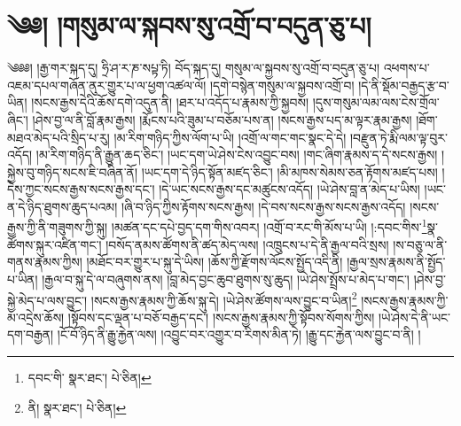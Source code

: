 \setcounter{footnote}{0} 
\chapter{༄༅། །གསུམ་ལ་སྐབས་སུ་འགྲོ་བ་བདུན་ཅུ་པ།}༄༅༅། །རྒྱ་གར་སྐད་དུ། ཧྲི་ཤ་ར་ཎ་སཔྟ་ཏི། བོད་སྐད་དུ། གསུམ་ལ་སྐྱབས་སུ་འགྲོ་བ་བདུན་ཅུ་པ། འཕགས་པ་འཇམ་དཔལ་གཞོན་ནུར་གྱུར་པ་ལ་ཕྱག་འཚལ་ལོ། །དགེ་བསྙེན་གསུམ་ལ་སྐྱབས་འགྲོ་བ། །དེ་ནི་སྡོམ་བརྒྱད་རྩ་བ་ཡིན། །སངས་རྒྱས་དེའི་ཆོས་དགེ་འདུན་ནི། །ཐར་པ་འདོད་པ་རྣམས་ཀྱི་སྐྱབས། །དུས་གསུམ་ལམ་ལས་ངེས་གྲོལ་ཞིང་། །ཤེས་བྱ་ལ་ནི་བློ་རྣམ་རྒྱས། །རྨོངས་པའི་ཟུམ་པ་བཅོམ་པས་ན། །སངས་རྒྱས་པད་མ་ལྟར་རྣམ་རྒྱས། །ཐོག་མཐའ་མེད་པའི་སྲིད་པ་རུ། །མ་རིག་གཉིད་ཀྱིས་ལོག་པ་ཡི། །འགྲོ་ལ་གང་གང་སྣང་དེ་དེ། །བརྫུན་ཏེ་རྨི་ལམ་ལྟ་བུར་འདོད། །མ་རིག་གཉིད་ནི་རྒྱུན་ཆད་ཅིང་། །ཡང་དག་ཡེ་ཤེས་ངེས་འབྱུང་བས། །གང་ཞིག་རྣམས་ད་དེ་སངས་རྒྱས། །སྐྱེས་བུ་གཉིད་སངས་ཇི་བཞིན་ནོ། །ཡང་དག་དེ་ཉིད་སྟོན་མཛད་ཅིང་། །མི་མཁས་སེམས་ཅན་རྟོགས་མཛད་པས། །དེས་ཀྱང་སངས་རྒྱས་སངས་རྒྱས་དང་། །དེ་ཡང་སངས་རྒྱས་དང་མཚུངས་འདོད། །ཡེ་ཤེས་བླ་ན་མེད་པ་ཡིས། །ཡང་ན་དེ་ཉིད་ཐུགས་ཆུད་པའམ། །ཞི་བ་ཉིད་ཀྱིས་རྟོགས་སངས་རྒྱས། །དེ་བས་སངས་རྒྱས་སངས་རྒྱས་འདོད། །སངས་རྒྱས་ཀྱི་ནི་གཟུགས་ཀྱི་སྐུ། །མཚན་དང་དཔེ་བྱད་དག་གིས་འབར། །འགྲོ་བ་རང་གི་མོས་པ་ཡི། །:དབང་གིས་\footnote{དབང་གི་  སྣར་ཐང་།  པེ་ཅིན། }སྣ་ཚོགས་སྐུར་འཛིན་གང་། །བསོད་ནམས་ཚོགས་ནི་ཚད་མེད་ལས། །འཁྲུངས་པ་དེ་ནི་རྒྱལ་བའི་སྲས། །ས་བཅུ་ལ་ནི་གནས་རྣམས་ཀྱིས། །མཐོང་བར་གྱུར་པ་སྐུ་དེ་ཡིས། །ཆོས་ཀྱི་རྫོགས་ལོངས་སྤྱོད་འདི་ནི། །རྒྱལ་སྲས་རྣམས་ནི་སྤྱོད་པ་ཡིན། །རྒྱལ་བ་སྐུ་དེ་ལ་བཞུགས་ནས། །བླ་མེད་བྱང་ཆུབ་ཐུགས་སུ་ཆུད། །ཡེ་ཤེས་སྤྲོས་པ་མེད་པ་གང་། །ཤེས་བྱ་སྐྱེ་མེད་པ་ལས་བྱུང་། །སངས་རྒྱས་རྣམས་ཀྱི་ཆོས་སྐུ་དེ། །ཡེ་ཤེས་ཚོགས་ལས་བྱུང་བ་ཡིན།\footnote{ནི།  སྣར་ཐང་།  པེ་ཅིན། } །སངས་རྒྱས་རྣམས་ཀྱི་མ་འདྲེས་ཆོས། །སྟོབས་དང་ལྡན་པ་བཅོ་བརྒྱད་དང་། །སངས་རྒྱས་རྣམས་ཀྱི་སྟོབས་སོགས་ཀྱིས། །ཡེ་ཤེས་དེ་ནི་ཡང་དག་བརྒྱན། །ངོ་བོ་ཉིད་ནི་རྒྱུ་རྐྱེན་ལས། །འབྱུང་བར་འགྱུར་བ་རིགས་མིན་ཏེ། །རྒྱུ་དང་རྐྱེན་ལས་བྱུང་བ་ནི། །
